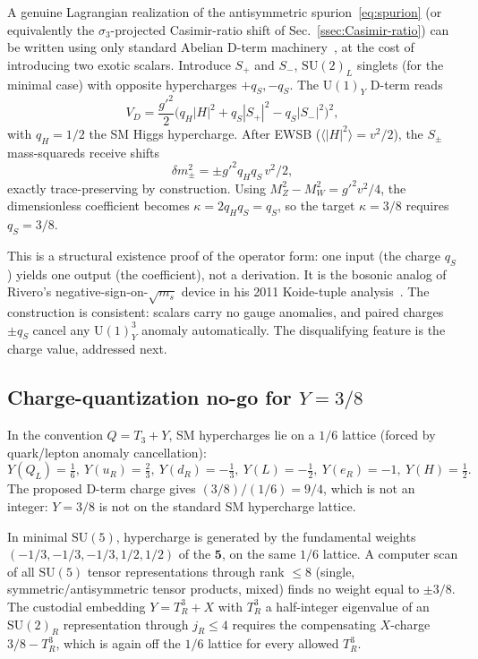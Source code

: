 \documentclass[twocolumn,aps,prd,floatfix,nofootinbib,superscriptaddress,10pt]{article}
\newcommand{\MW}{M_W}
\newcommand{\MZ}{M_Z}
\begin{document}
A genuine Lagrangian realization of the antisymmetric spurion~\eqref{eq:spurion} (or equivalently the $\sigma_3$-projected Casimir-ratio shift of Sec.~\ref{ssec:Casimir-ratio}) can be written using only standard Abelian D-term machinery~\cite{BatraDelgado2004}, at the cost of introducing two exotic scalars.  Introduce $S_+$ and $S_-$, $\mathrm{SU}(2)_L$ singlets (for the minimal case) with opposite hypercharges $+q_S,-q_S$.  The $\mathrm{U}(1)_Y$ D-term reads
\begin{equation}
V_D = \frac{g'^2}{2}\Big( q_H |H|^2 + q_S |S_+|^2 - q_S |S_-|^2 \Big)^2 ,
\label{eq:VD}
\end{equation}
with $q_H=1/2$ the SM Higgs hypercharge.  After EWSB ($\langle |H|^2\rangle = v^2/2$), the $S_\pm$ mass-squareds receive shifts
\begin{equation}
\delta m_\pm^2 = \pm g'^2 q_H q_S\,v^2/2 ,
\end{equation}
exactly trace-preserving by construction.  Using $\MZ^2-\MW^2=g'^2v^2/4$, the dimensionless coefficient becomes $\kappa = 2 q_H q_S = q_S$, so the target $\kappa = 3/8$ requires $q_S = 3/8$.

This is a structural existence proof of the operator form: one input (the charge $q_S$) yields one output (the coefficient), not a derivation.  It is the bosonic analog of Rivero's negative-sign-on-$\sqrt{m_s}$ device in his 2011 Koide-tuple analysis~\cite{Rivero2011Koide}.  The construction is consistent: scalars carry no gauge anomalies, and paired charges $\pm q_S$ cancel any $\mathrm{U}(1)_Y^3$ anomaly automatically.  The disqualifying feature is the charge value, addressed next.

\subsection{Charge-quantization no-go for $Y = 3/8$}
\label{sec:nogo}

In the convention $Q=T_3+Y$, SM hypercharges lie on a $1/6$ lattice (forced by quark/lepton anomaly cancellation):
\begin{equation}
Y(Q_L)=\tfrac16,~Y(u_R)=\tfrac23,~Y(d_R)=-\tfrac13,~Y(L)=-\tfrac12,~Y(e_R)=-1,~Y(H)=\tfrac12.
\end{equation}
The proposed D-term charge gives $(3/8)/(1/6)=9/4$, which is not an integer: $Y=3/8$ is not on the standard SM hypercharge lattice.

In minimal $\mathrm{SU}(5)$, hypercharge is generated by the fundamental weights $(-1/3,-1/3,-1/3,1/2,1/2)$ of the $\mathbf 5$, on the same $1/6$ lattice.  A computer scan of all $\mathrm{SU}(5)$ tensor representations through rank $\le 8$ (single, symmetric/antisymmetric tensor products, mixed) finds no weight equal to $\pm 3/8$.  The custodial embedding $Y=T_R^3+X$ with $T_R^3$ a half-integer eigenvalue of an $\mathrm{SU}(2)_R$ representation through $j_R \le 4$ requires the compensating $X$-charge $3/8-T_R^3$, which is again off the $1/6$ lattice for every allowed $T_R^3$.
\end{document}
